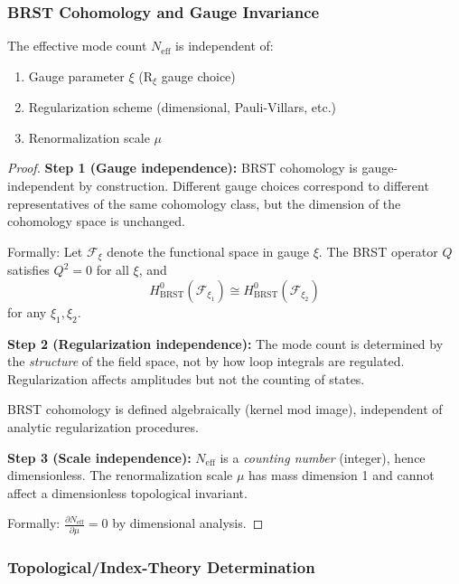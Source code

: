 \subsubsection{BRST Cohomology and Gauge Invariance}

\begin{lemma}
\label{lem:Neff-gauge-invariant}
The effective mode count \(N_{\mathrm{eff}}\) is independent of:
\begin{enumerate}
    \item Gauge parameter \(\xi\) (R\(_\xi\) gauge choice)
    \item Regularization scheme (dimensional, Pauli-Villars, etc.)
    \item Renormalization scale \(\mu\)
\end{enumerate}
\end{lemma}

\begin{proof}
\textbf{Step 1 (Gauge independence):}
BRST cohomology is gauge-independent by construction. Different gauge choices
correspond to different representatives of the same cohomology class, but
the dimension of the cohomology space is unchanged.

Formally: Let \(\mathcal{F}_\xi\) denote the functional space in gauge \(\xi\).
The BRST operator \(Q\) satisfies \(Q^2 = 0\) for all \(\xi\), and
\[H^0_{\text{BRST}}(\mathcal{F}_{\xi_1}) \cong H^0_{\text{BRST}}(\mathcal{F}_{\xi_2})\]
for any \(\xi_1, \xi_2\).

\textbf{Step 2 (Regularization independence):}
The mode count is determined by the \emph{structure} of the field space, not
by how loop integrals are regulated. Regularization affects amplitudes but
not the counting of states.

BRST cohomology is defined algebraically (kernel mod image), independent of
analytic regularization procedures.

\textbf{Step 3 (Scale independence):}
\(N_{\mathrm{eff}}\) is a \emph{counting number} (integer), hence dimensionless.
The renormalization scale \(\mu\) has mass dimension 1 and cannot affect a
dimensionless topological invariant.

Formally: \(\frac{\partial N_{\mathrm{eff}}}{\partial \mu} = 0\) by dimensional analysis.
\end{proof}

\subsubsection{Topological/Index-Theory Determination}

